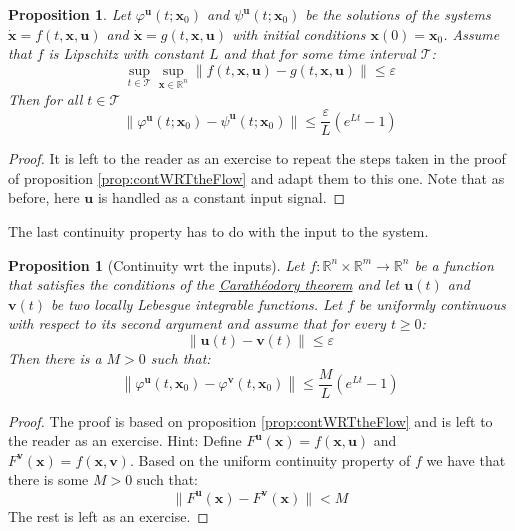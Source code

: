 \documentclass[a4paper,10pt,oneside]{book}
\newtheorem{proposition}[theorem]{Proposition}
\begin{document}
\begin{proposition}\label{prop:continuityWRTtheFlowTimeVaryingCase}
  Let $\varphi^{\mathbf{u}}(t;\mathbf{x}_0)$ and $\psi^{\mathbf{u}}(t;\mathbf{x}_0)$ be the solutions of the systems $\dot{\mathbf{x}}=f(t,\mathbf{x},\mathbf{u})$ and $\dot{\mathbf{x}}=g(t,\mathbf{x},\mathbf{u})$ with initial conditions $\mathbf{x}(0)=\mathbf{x}_0$. Assume that $f$ is Lipschitz with constant $L$ and that for some time interval $\mathcal{T}$:
\begin{equation}
 \sup_{t\in\mathcal{T}}\sup_{\mathbf{x}\in\mathbb{R}^n}\|f(t,\mathbf{x},\mathbf{u})-g(t,\mathbf{x},\mathbf{u})\|\leq \varepsilon
\end{equation}
Then for all $t\in\mathcal{T}$
\begin{equation}
 \|\varphi^{\mathbf{u}}(t;\mathbf{x}_0)-\psi^{\mathbf{u}}(t;\mathbf{x}_0)\|\leq\frac{\varepsilon}{L}(e^{Lt}-1)
\end{equation}
\end{proposition}
\begin{proof}
 It is left to the reader as an exercise to repeat the steps taken in the proof of proposition \ref{prop:contWRTtheFlow} and adapt them to this one. Note that as before, here $\mathbf{u}$ is handled as a constant input signal.
\end{proof}

\noindent The last continuity property has to do with the input to the system. 
\begin{proposition}[Continuity wrt the inputs]
 Let $f:\mathbb{R}^n\times\mathbb{R}^m\to\mathbb{R}^n$ be a function that satisfies the conditions of the \hyperlink{thm:caratheodory}{Carath\'{e}odory theorem} and let $\mathbf{u}(t)$ and $\mathbf{v}(t)$ be two locally Lebesgue integrable functions. Let $f$ be uniformly continuous with respect to its second argument and assume that for every $t\geq 0$:
\begin{equation}
 \left\|\mathbf{u}(t)-\mathbf{v}(t)\right\|\leq \varepsilon
\end{equation}
Then there is a $M>0$ such that:
\begin{equation}
 \left\|
\varphi^{\mathbf{u}}(t,\mathbf{x}_0)-\varphi^{\mathbf{v}}(t,\mathbf{x}_0)
\right\|\leq \frac{M}{L}(e^{Lt}-1)
\end{equation}
\end{proposition}
\begin{proof}
 The proof is based on proposition \ref{prop:contWRTtheFlow} and is left to the reader as an exercise. Hint: Define $F^{\mathbf{u}}(\mathbf{x})=f(\mathbf{x},\mathbf{u})$ and $F^{\mathbf{v}}(\mathbf{x})=f(\mathbf{x},\mathbf{v})$. Based on the uniform continuity property of $f$ we have that there is some $M>0$ such that:
\begin{equation}
 \|F^{\mathbf{u}}(\mathbf{x})-F^{\mathbf{v}}(\mathbf{x})\|<M
\end{equation}
The rest is left as an exercise.
\end{proof}
\end{document}
